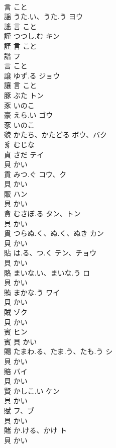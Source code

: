 \documentclass[8pt]{extreport}
\begin{document}
\begin{CJK}{UTF8}{min}
\\	言		こと		
\\	謡	うた.い、うた.う	ヨウ	
\\	謠	言		こと		
\\	謹	つつし.む	キン	
\\	謹	言		こと		
\\	譜		フ	
\\	言		こと		
\\	譲	ゆず.る	ジョウ	
\\	讓	言		こと		
\\	豚	ぶた	トン	
\\	豕		いのこ		
\\	豪	えら.い	ゴウ	
\\	豕		いのこ		
\\	貌	かたち、かたどる	ボウ、バク	
\\	豸		むじな		
\\	貞	さだ	テイ	
\\	貝		かい		
\\	貢	みつ.ぐ	コウ、ク	
\\	貝		かい		
\\	販		ハン	
\\	貝		かい		
\\	貪	むさぼ.る	タン、トン	
\\	貝		かい		
\\	貫	つらぬ.く、ぬ.く、ぬき	カン	
\\	貝		かい		
\\	貼	は.る、つ.く	テン、チョウ	
\\	貝		かい		
\\	賂	まいな.い、まいな.う	ロ	
\\	貝		かい		
\\	賄	まかな.う	ワイ	
\\	貝		かい		
\\	賊		ゾク	
\\	貝		かい		
\\	賓		ヒン	
\\	賓	貝		かい		
\\	賜	たまわ.る、たま.う、たも.う	シ	
\\	貝		かい		
\\	賠		バイ	
\\	貝		かい		
\\	賢	かしこ.い	ケン	
\\	貝		かい		
\\	賦		フ、ブ	
\\	貝		かい		
\\	賭	か.ける、かけ	ト	
\\	貝		かい		

\end{CJK}
\end{document}
